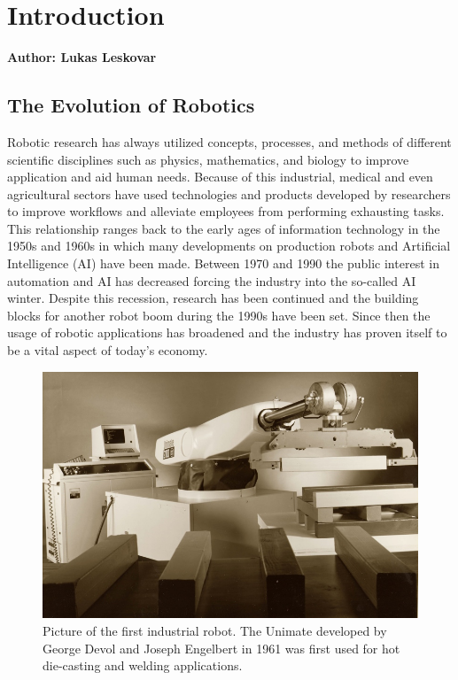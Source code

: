 \chapter{Introduction}

\textbf{Author: Lukas Leskovar}

\vspace{2mm}

\section{The Evolution of Robotics}


Robotic research has always utilized concepts, processes, and methods of different scientific disciplines such as physics, mathematics, and biology to improve application and aid human needs. Because of this industrial, medical and even agricultural sectors have used technologies and products developed by researchers to improve workflows and alleviate employees from performing exhausting tasks. This relationship ranges back to the early ages of information technology in the 1950s and 1960s in which many developments on production robots and Artificial Intelligence (AI) have been made.
Between 1970 and 1990 the public interest in automation and AI has decreased forcing the industry into the so-called AI winter. Despite this recession, research has been continued and the building blocks for another robot boom during the 1990s have been set. Since then the usage of robotic applications has broadened and the industry has proven itself to be a vital aspect of today's economy.

\begin{figure}
	\centering
	\includegraphics[width=0.7\linewidth]{img/unimate}
	\caption{
		Picture of the first industrial robot. The Unimate developed by George Devol and Joseph Engelbert in 1961 was first used for hot die-casting and welding applications.\protect\footnotemark[1]
	}
	\label{fig:unimate}
\end{figure}
\addtocounter{footnote}{+1}

